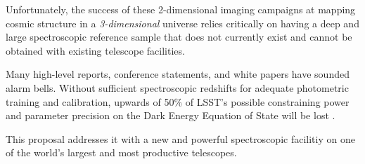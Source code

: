 \documentclass[oneside,11pt]{amsart}
\begin{document}
Unfortunately, the success of these 2-dimensional imaging campaigns at mapping cosmic structure in a {\em 3-dimensional} universe relies critically on having a deep and large spectroscopic reference sample that does not currently exist and cannot be obtained with existing telescope facilities.

Many high-level reports, conference statements, and white papers have sounded alarm bells.  Without sufficient spectroscopic redshifts for adequate photometric training and calibration, upwards of 50\% of LSST's possible constraining power and parameter precision on the Dark Energy Equation of State will be lost \citep{newman15}.  

 This proposal addresses it with a new and powerful spectroscopic facilitiy on one of the world's largest and most productive telescopes.  



\end{document}
